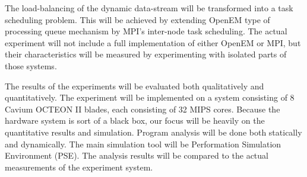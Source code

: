 The load-balancing of the dynamic data-stream will be transformed into a task scheduling problem. This will be achieved by extending OpenEM type of processing queue mechanism by MPI's inter-node task scheduling. The actual experiment will not include a full implementation of either OpenEM or MPI, but their characteristics will be measured by experimenting with isolated parts of those systems.

The results of the experiments will be evaluated both qualitatively and quantitatively. The experiment will be implemented on a system consisting of 8 Cavium OCTEON II blades, each consisting of 32 MIPS cores. Because the hardware system is sort of a black box, our focus will be heavily on the quantitative results and simulation. Program analysis will be done both statically and dynamically. The main simulation tool will be Performation Simulation Environment (PSE). The analysis results will be compared to the actual measurements of the experiment system.

